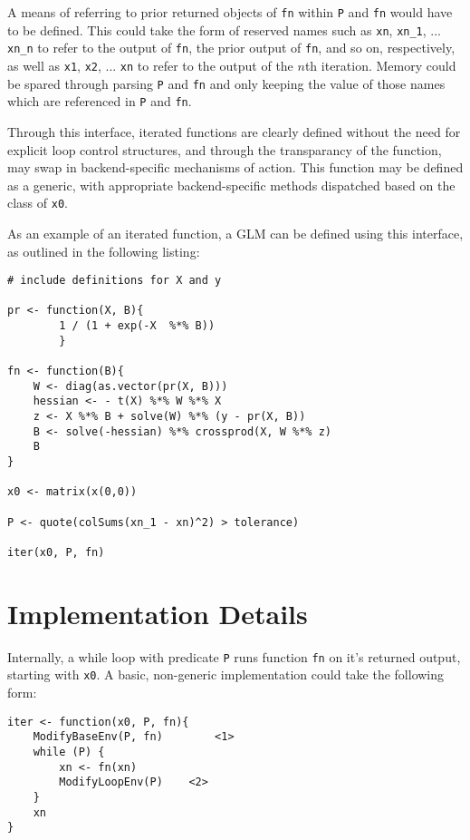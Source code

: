 \documentclass[a4paper,10pt]{article}
\begin{document}
A means of referring to prior returned objects of \texttt{fn} within \texttt{P}
and \texttt{fn} would have to be defined.
This could take the form of reserved names such as \texttt{xn}, \texttt{xn\_1},
... \texttt{xn\_n} to refer to the output of \texttt{fn}, the prior output of
\texttt{fn}, and so on, respectively, as well as \texttt{x1}, \texttt{x2}, ...
\texttt{xn} to refer to the output of the \(n\)th iteration.
Memory could be spared through parsing \texttt{P} and \texttt{fn} and only
keeping the value of those names which are referenced in \texttt{P} and
\texttt{fn}.

Through this interface, iterated functions are clearly defined without the need
for explicit loop control structures, and through the transparancy of the
function, may swap in backend-specific mechanisms of action.
This function may be defined as a generic, with appropriate backend-specific
methods dispatched based on the class of \texttt{x0}.

As an example of an iterated function, a GLM can be defined using this
interface, as outlined in the following listing:

\begin{verbatim}
# include definitions for X and y

pr <- function(X, B){
		1 / (1 + exp(-X  %*% B))
		}

fn <- function(B){
	W <- diag(as.vector(pr(X, B)))
	hessian <- - t(X) %*% W %*% X
	z <- X %*% B + solve(W) %*% (y - pr(X, B))
	B <- solve(-hessian) %*% crossprod(X, W %*% z)
	B
}

x0 <- matrix(x(0,0))

P <- quote(colSums(xn_1 - xn)^2) > tolerance)

iter(x0, P, fn)
\end{verbatim}

\section{Implementation Details}

Internally, a while loop with predicate \texttt{P} runs function \texttt{fn} on
it's returned output, starting with \texttt{x0}.
A basic, non-generic implementation could take the following form:

\begin{verbatim}
iter <- function(x0, P, fn){
	ModifyBaseEnv(P, fn)		<1>
	while (P) {
		xn <- fn(xn)
		ModifyLoopEnv(P)	<2>
	}
	xn
}
\end{verbatim}
\end{document}
